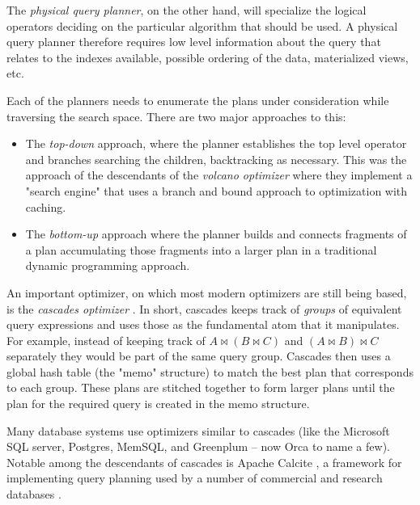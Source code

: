 The \emph{physical query planner}, on the other hand, will specialize
the logical operators deciding on the particular algorithm that should
be used. A physical query planner therefore requires low level
information about the query that relates to the indexes available,
possible ordering of the data, materialized views, etc.

Each of the planners needs to enumerate the plans under
consideration while traversing the search space. There are two major
approaches to this:

\begin{itemize}
\item The \emph{top-down} approach, where the planner establishes the
  top level operator and branches searching the children, backtracking
  as necessary. This was the approach of the descendants of the
  \emph{volcano optimizer} \cite{graefeVolcanoOptimizerGenerator1993a}
  where they implement a "search engine" that uses a branch and bound
  approach to optimization with caching.
\item The \emph{bottom-up} approach where the planner builds and
  connects fragments of a plan accumulating those fragments into a
  larger plan in a traditional dynamic programming approach.
  \cite{raasveldtDuckdbEmbeddableAnalytical2019,kemperHyPerHybridOLTP2011}
\end{itemize}

An important optimizer, on which most modern optimizers are still
being based, is the \emph{cascades optimizer}
\cite{graefeCascadesFrameworkQuery1995}. In short, cascades keeps
track of \emph{groups} of equivalent query expressions and uses those
as the fundamental atom that it manipulates. For example, instead of
keeping track of \(A \Join (B \Join C)\) and \((A \Join B) \Join C\)
separately they would be part of the same query group. Cascades then uses a
global hash table (the "memo" structure) to match the best plan that
corresponds to each group. These plans are stitched together to form larger 
plans until the plan for the required query is created in the memo structure.

Many database systems use optimizers similar to cascades (like the
Microsoft SQL server, Postgres,
MemSQL\cite{chenMemSQLQueryOptimizer2016}, and Greenplum -- now Orca
\cite{solimanOrcaModularQuery2014a} to name a few). Notable among the
descendants of cascades is Apache Calcite
\cite{begoliApacheCalciteFoundational2018}, a framework for
implementing query planning used by a number of commercial and
research databases \cite{nunesalonsoBuildingPolyglotData2020}.

